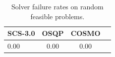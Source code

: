 \begin{table}
\centering
\caption{Solver failure rates on random feasible problems.}
\label{t-random feasible-failure}
\begin{tabular}{lccc}
\toprule
 SCS-3.0 &  OSQP &  COSMO \\
\midrule
    0.00 &  0.00 &   0.00 \\
\bottomrule
\end{tabular}
\end{table}
